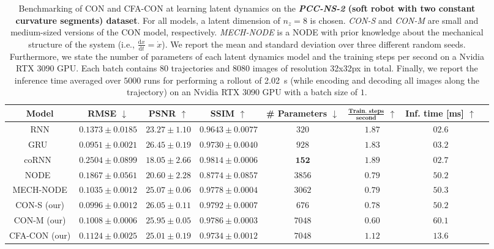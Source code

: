\begin{table}[ht]
    \centering
    \begin{scriptsize}
    \setlength\tabcolsep{2.0pt}
    \begin{tabular}{c c c c c c c c}
         \toprule
         \textbf{Model} & \textbf{RMSE} $\downarrow$ & \textbf{PSNR} $\uparrow$ & \textbf{SSIM} $\uparrow$ & \textbf{\# Parameters} $\downarrow$ & $\mathbf{\frac{\text{Train. steps}}{\text{second}}}$ $\uparrow$ & \textbf{Inf. time} [ms] $\uparrow$\\
         \midrule
         RNN & $0.1373 \pm 0.0185$ & $23.27 \pm 1.10$ & $0.9643 \pm 0.0077$ & $320$ & $1.87$ & $02.6$\\
         GRU~\citep{cho2014learning} & $0.0951 \pm 0.0021$ & $\mathbf{26.45 \pm 0.19}$ & $0.9730 \pm 0.0040$ & $928$ & $1.83$ & $03.2$\\
         coRNN~\citep{rusch2020coupled} & $0.2504 \pm 0.0899$ & $18.05 \pm 2.66$ & $0.9814 \pm 0.0006$ & $\mathbf{152}$ & $\mathbf{1.89}$ & $02.7$\\
         NODE~\citep{chen2018neural} & $0.1867 \pm 0.0561$ & $20.60 \pm 2.28$ & $0.8774 \pm 0.0857$ & $3856$ & $0.79$ & $50.2$\\
         MECH-NODE & $0.1035 \pm 0.0012$ & $25.07 \pm 0.06$ & $0.9778 \pm 0.0004$ & $3062$ & $0.79$ & $50.3$\\
         CON-S (our) & $0.0996 \pm 0.0012$ & $26.05 \pm 0.11$ & $\mathbf{0.9792 \pm 0.0007}$ & $676$ & $0.78$ & $50.2$\\
         CON-M (our) & $0.1008 \pm 0.0006$ & $25.95 \pm 0.05$ & $0.9786 \pm 0.0003$ & $7048$ & $0.60$ & $60.1$\\
         CFA-CON (our) & $0.1124 \pm 0.0025$ & $25.01 \pm 0.19$ & $0.9734 \pm 0.0012$ & $7048$ & $1.12$ & $13.6$\\
         \bottomrule
    \end{tabular}
    \end{scriptsize}
    \vspace{0.5cm}
    \caption{Benchmarking of \gls{CON} and \gls{CFA-CON} at learning latent dynamics on the \textbf{\emph{PCC-NS-2} (soft robot with two constant curvature segments) dataset}. For all models, a latent dimension of $n_z=8$ is chosen. \emph{CON-S} and \emph{CON-M} are small and medium-sized versions of the \gls{CON} model, respectively. \emph{MECH-NODE} is a \gls{NODE} with prior knowledge about the mechanical structure of the system (i.e., $\frac{\mathrm{d}x}{\mathrm{d}t} = \dot{x}$). We report the mean and standard deviation over three different random seeds. Furthermore, we state the number of parameters of each latent dynamics model and the training steps per second on a Nvidia RTX 3090 GPU. Each batch contains $80$ trajectories and $8080$ images of resolution 32x32px in total. Finally, we report the inference time averaged over $5000$ runs for performing a rollout of \SI{2.02}{s} (while encoding and decoding all images along the trajectory) on an Nvidia RTX 3090 GPU with a batch size of $1$.
}
    \label{tab:apx-con:latent_dynamics_results:pcc_ns-2}
\end{table}

